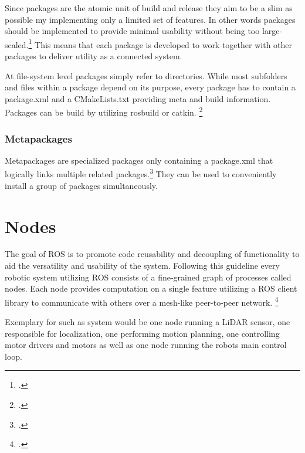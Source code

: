 Since packages are the atomic unit of build and release they aim to be a slim as possible my implementing only a limited set of features. 
In other words packages should be implemented to provide minimal usability without being too large-scaled.\footcite{openSourceRoboticsFoundationPackageNodate} This means that each package is developed to work together with other packages to deliver utility as a connected system.  

At file-system level packages simply refer to directories. While most subfolders and files within a package depend on its purpose, every package has to contain a package.xml and a CMakeLists.txt providing meta and build information.
Packages can be build by utilizing rosbuild or catkin. \footcite{openSourceRoboticsFoundationBuildNodate}

\subsubsection{Metapackages} 
Metapackages are specialized packages only containing a package.xml that logically links multiple related packages.\footcite{openSourceRoboticsFoundationMetapackageNodate}
They can be used to conveniently install a group of packages simultaneously. %



\section{Nodes}
The goal of ROS is to promote code reusability and decoupling of functionality to aid the versatility and usability of the system. 
Following this guideline every robotic system utilizing ROS consists of a fine-grained graph of processes called nodes. Each node provides computation on a single feature utilizing a ROS client library to communicate with others over a mesh-like peer-to-peer network. \footcite{openSourceRoboticsFoundationNodesNodate}

Exemplary for such as system would be one node running a LiDAR sensor, one responsible for localization, one performing motion planning, one controlling motor drivers and motors as well as one node running the robots main control loop.

